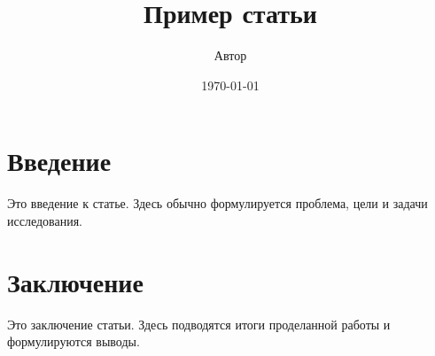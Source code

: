 \documentclass{article}
\title{Пример статьи}
\author{Автор}
\date{\today}
\begin{document}
\maketitle

\section{Введение}
Это введение к статье. Здесь обычно формулируется проблема, цели и задачи исследования.

\section{Заключение}
Это заключение статьи. Здесь подводятся итоги проделанной работы и формулируются выводы.
\end{document}

